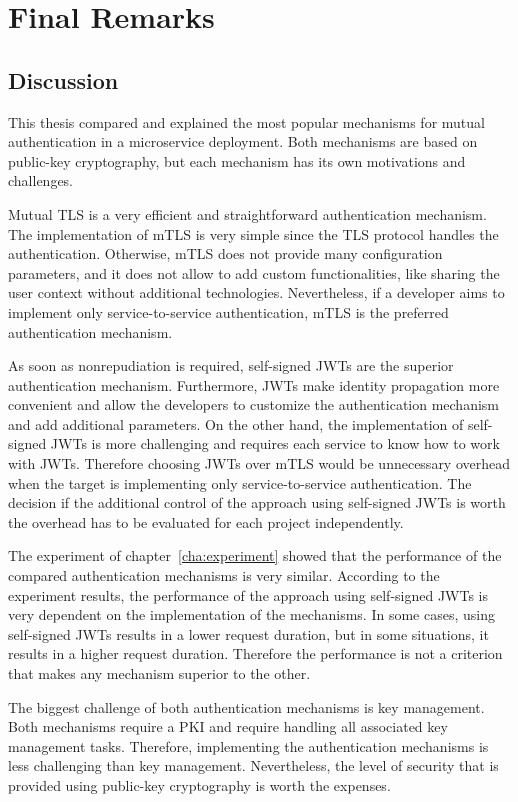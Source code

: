 \chapter{Final Remarks}
\label{cha:final_remarks}

\section{Discussion}
This thesis compared and explained the most popular mechanisms for mutual authentication in a microservice deployment.
Both mechanisms are based on public-key cryptography, but each mechanism has its own motivations and challenges.

Mutual TLS is a very efficient and straightforward authentication mechanism.
The implementation of mTLS is very simple since the TLS protocol handles the authentication.
Otherwise, mTLS does not provide many configuration parameters, and it does not allow to add custom functionalities, like sharing the user context without additional technologies.
Nevertheless, if a developer aims to implement only service-to-service authentication, mTLS is the preferred authentication mechanism.

As soon as nonrepudiation is required, self-signed JWTs are the superior authentication mechanism.
Furthermore, JWTs make identity propagation more convenient and allow the developers to customize the authentication mechanism and add additional parameters.
On the other hand, the implementation of self-signed JWTs is more challenging and requires each service to know how to work with JWTs.
Therefore choosing JWTs over mTLS would be unnecessary overhead when the target is implementing only service-to-service authentication.
The decision if the additional control of the approach using self-signed JWTs is worth the overhead has to be evaluated for each project independently.

The experiment of chapter~\ref{cha:experiment} showed that the performance of the compared authentication mechanisms is very similar.
According to the experiment results, the performance of the approach using self-signed JWTs is very dependent on the implementation of the mechanisms.
In some cases, using self-signed JWTs results in a lower request duration, but in some situations, it results in a higher request duration.
Therefore the performance is not a criterion that makes any mechanism superior to the other.

The biggest challenge of both authentication mechanisms is key management.
Both mechanisms require a PKI and require handling all associated key management tasks.
Therefore, implementing the authentication mechanisms is less challenging than key management.
Nevertheless, the level of security that is provided using public-key cryptography is worth the expenses.

